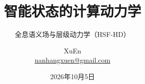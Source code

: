 \title{智能状态的计算动力学}
\subtitle{全息语义场与层级动力学（HSF-HD）}
\author{XuEn\\\url{nanhangxuen@gmail.com}}
\date{2026年10月5日}
